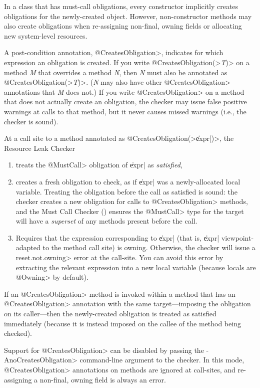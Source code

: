 In a class that has must-call obligations,
every constructor implicitly creates obligations for the newly-created object.
However, non-constructor methods may also create obligations
when re-assigning non-final, owning fields or allocating
new system-level resources.

A post-condition annotation,
\<@CreatesObligation>,
indicates for which expression an obligation is created.
If you write \<@CreatesObligation(>\emph{T}\<)> on a method \emph{M} that
overrides a method \emph{N}, then \emph{N} must also be annotated as
\<@CreatesObligation(>\emph{T}\<)>.  (\emph{N} may also have other
\<@CreatesObligation> annotations that \emph{M} does not.)
If you write \<@CreatesObligation> on a method that does not actually
create an obligation, the checker may issue false positive warnings at calls to
that method, but it never causes
missed warnings (i.e., the checker is sound).

At a call site to a method annotated as
\<@CreatesObligation(>\|expr|\<)>, the Resource Leak Checker
\begin{enumerate}
\item
  treats the \<@MustCall> obligation of \|expr| as \emph{satisfied},
\item
  creates a fresh obligation to check, as if \|expr| was a newly-allocated local
  variable.  Treating the obligation before the call as satisfied is sound: the
  checker creates a new obligation for calls to \<@CreatesObligation> methods,
  and the Must Call Checker () ensures the
  \<@MustCall> type for the target will have a \emph{superset} of any methods
  present before the call.
\item
  Requires that the expression corresponding to \|expr| (that is, \|expr|
  viewpoint-adapted to the method call site) is owning.  Otherwise, the checker
  will issue a \<reset.not.owning> error at the call-site. You can avoid this
  error by extracting the relevant expression into a new local variable (because
  locals are \<@Owning> by default).
\end{enumerate}

If an \<@CreatesObligation>
method is invoked within a method that has an \<@CreatesObligation> annotation
with the same target---imposing the obligation on its caller---then
the newly-created obligation is treated as satisfied immediately (because it is instead imposed
on the callee of the method being checked).

Support for \<@CreatesObligation> can be disabled by passing the \<-AnoCreatesObligation> command-line
argument to the checker. In this mode, \<@CreatesObligation> annotations on methods are ignored at call-sites,
and re-assigning a non-final, owning field is always an error.


